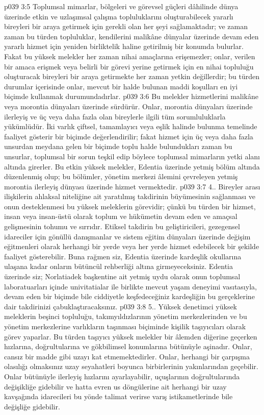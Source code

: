 \vs p039 3:5 Toplumsal mimarlar, bölgeleri ve görevsel güçleri dâhilinde dünya üzerinde etkin ve uzlaşımsal çalışma topluluklarını oluşturabilecek yararlı bireyleri bir araya getirmek için gerekli olan her şeyi sağlamaktadır; ve zaman zaman bu türden topluluklar, kendilerini malikâne dünyalar üzerinde devam eden yararlı hizmet için yeniden birliktelik haline getirilmiş bir konumda bulurlar. Fakat bu yüksek melekler her zaman nihai amaçlarına erişemezler; onlar, verilen bir amaca erişmek veya belirli bir görevi yerine getirmek için en nihai topluluğu oluşturacak bireyleri bir araya getirmekte her zaman yetkin değillerdir; bu türden durumlar içerisinde onlar, mevcut bir halde bulunan maddi koşulları en iyi biçimde kullanmak durumundadırlar.
\vs p039 3:6 Bu melekler hizmetlerini malikâne veya morontia dünyaları üzerinde sürdürür. Onlar, morontia dünyaları üzerinde ilerleyiş ve üç veya daha fazla olan bireylerle ilgili tüm sorumluluklarla yükümlüdür. İki varlık çiftsel, tamamlayıcı veya eşlik halinde bulunma temelinde faaliyet gösterir bir biçimde değerlendirilir; fakat hizmet için üç veya daha fazla unsurdan meydana gelen bir biçimde toplu halde bulundukları zaman bu unsurlar, toplumsal bir sorun teşkil edip böylece toplumsal mimarların yetki alanı altında girerler. Bu etkin yüksek melekler, Edentia üzerinde yetmiş bölüm altında düzenlenmiş olup; bu bölümler, yönetim merkezi âlemini çevreleyen yetmiş morontia ilerleyiş dünyası üzerinde hizmet vermektedir.
\vs p039 3:7 4.\bibnobreakspace {}. Bireyler arası ilişkilerin ahlaksal niteliğine ait yaratılmış takdirinin büyümesinin sağlanması ve onun desteklenmesi bu yüksek meleklerin görevidir; çünkü bu türden bir hizmet, insan veya insan\hyp{}üstü olarak toplum ve hükümetin devam eden ve amaçsal gelişmesinin tohumu ve sırrıdır. Etiksel takdirin bu geliştiricileri, gezegensel idareciler için gönüllü danışmanlar ve sistem eğitim dünyaları üzerinde değişim eğitmenleri olarak herhangi bir yerde veya her yerde hizmet edebilecek bir şekilde faaliyet gösterebilir. Buna rağmen siz, Edentia üzerinde kardeşlik okullarına ulaşana kadar onların bütüncül rehberliği altına girmeyeceksiniz. Edentia üzerinde siz; Norlatiadek başkentine ait yetmiş uydu olarak onun toplumsal laboratuarları içinde univitatialar ile birlikte mevcut yaşam deneyimi vasıtasıyla, devam eden bir biçimde bile ciddiyetle keşfedeceğiniz kardeşliğin bu gerçeklerine dair takdirinizi çabuklaştıracaksınız.
\vs p039 3:8 5.\bibnobreakspace {}. Yüksek denetimci yüksek meleklerin beşinci topluluğu, takımyıldızlarının yönetim merkezlerinden ve bu yönetim merkezlerine varlıkların taşınması biçiminde kişilik taşıyıcıları olarak görev yaparlar. Bu türden taşıyıcı yüksek melekler bir âlemden diğerine geçerken hızlarına, doğrultularına ve gökbilimsel konumlarına bütünüyle aşinadır. Onlar, cansız bir madde gibi uzayı kat etmemektedirler. Onlar, herhangi bir çarpışma olasılığı olmaksınız uzay seyahatleri boyunca birbirlerinin yakınlarından geçebilir. Onlar bütünüyle ilerleyiş hızlarını ayarlayabilir, uçuşlarının doğrultularında değişikliğe gidebilir ve hatta evren us döngülerine ait herhangi bir uzay kavşağında idarecileri bu yönde talimat verirse varış istikametlerinde bile değişliğe gidebilir.
